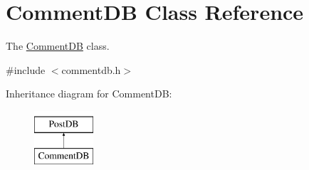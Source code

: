 \hypertarget{classCommentDB}{}\section{Comment\+DB Class Reference}
\label{classCommentDB}


The \hyperlink{classCommentDB}{Comment\+DB} class.  




{\ttfamily \#include $<$commentdb.\+h$>$}

Inheritance diagram for Comment\+DB\+:\begin{figure}[H]
\begin{center}
\leavevmode
\includegraphics[height=2.000000cm]{classCommentDB}
\end{center}
\end{figure}
